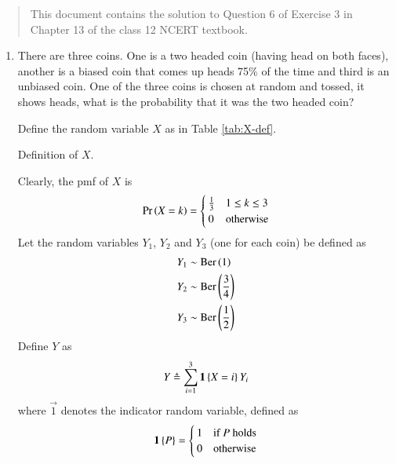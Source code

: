 \documentclass[journal,12pt,twocolumn]{IEEEtran}
\begin{document}
\begin{abstract}
    This document contains the solution to Question 6 of 
    Exercise 3 in Chapter 13 of the class 12 NCERT textbook.
\end{abstract}

\begin{enumerate}
    \item There are three coins. One is a two headed coin (having head on both 
    faces), another is a biased coin that comes up heads 75\% of the time and 
    third is an unbiased coin. One of the three coins is chosen at random and 
    tossed, it shows heads, what is the probability that it was the two headed 
    coin?

    \solution Define the random variable $X$ as in Table \ref{tab:X-def}.
    \begin{table}[!ht]
        \centering
        
        \caption{Definition of $X$.}
        \label{tab:X-def}
    \end{table}
    Clearly, the pmf of $X$ is
    \begin{align}
        \Pr\left(X=k\right) =
        \begin{cases}
            \frac{1}{3} & 1 \le k \le 3 \\
            0 & \textrm{otherwise}
        \end{cases} 
        \label{eq:X-pmf}
    \end{align}
    Let the random variables $Y_1$, $Y_2$ and $Y_3$ (one for each coin) be
    defined as
    \begin{align}
        Y_1 &\sim \textrm{Ber}\left(1\right) \label{eq:Y-1-def} \\
        Y_2 &\sim \textrm{Ber}\left(\frac{3}{4}\right) \label{eq:Y-2-def} \\
        Y_3 &\sim \textrm{Ber}\left(\frac{1}{2}\right) \label{eq:Y-3-def}
    \end{align}
    Define $Y$ as
    \begin{align}
        Y \triangleq \sum_{i=1}^3\mathbf{1}\left\{X=i\right\}Y_i
        \label{eq:Y-def}
    \end{align}
    where $\vec{1}$ denotes the indicator random variable, defined as
    \begin{align}
        \mathbf{1}\left\{P\right\} = 
        \begin{cases}
            1 & \textrm{if $P$ holds} \\
            0 & \textrm{otherwise}
        \end{cases}
    \end{align}

\end{enumerate}
\end{document}
